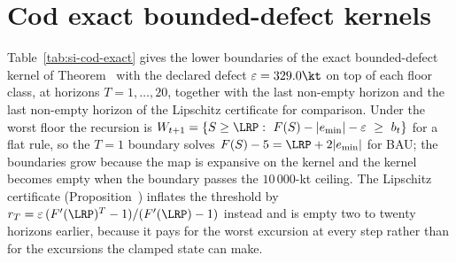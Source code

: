 \section{Cod exact bounded-defect kernels}\label{si:cod-exact}
Table~\ref{tab:si-cod-exact} gives the lower boundaries of the exact bounded-defect kernel of Theorem~ with the declared defect $\varepsilon=329.0\kt$ on top of each floor class, at horizons $T=1,\dots,20$, together with the last non-empty horizon and the last non-empty horizon of the Lipschitz certificate for comparison. Under the worst floor the recursion is $W_{t+1}=\{S\ge\LRP:\ F(S)-|e_{\min}|-\varepsilon\ \ge\ b_t\}$ for a flat rule, so the $T=1$ boundary solves $F(S)-5=\LRP+2|e_{\min}|$ for BAU; the boundaries grow because the map is expansive on the kernel and the kernel becomes empty when the boundary passes the $10\,000$-kt ceiling. The Lipschitz certificate (Proposition~) inflates the threshold by $r_T=\varepsilon\,(F'(\LRP)^T-1)/(F'(\LRP)-1)$ instead and is empty two to twenty horizons earlier, because it pays for the worst excursion at every step rather than for the excursions the clamped state can make.

